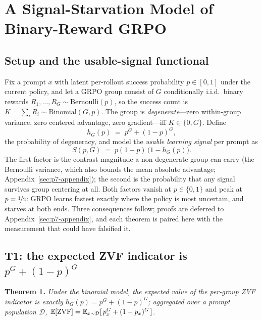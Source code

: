 \section{A Signal-Starvation Model of Binary-Reward GRPO}
\label{sec:p7-theory}

\subsection{Setup and the usable-signal functional}
\label{sec:p7-theory-setup}
Fix a prompt $x$ with latent per-rollout success probability $p \in [0,1]$
under the current policy, and let a GRPO group consist of $G$ conditionally
i.i.d.\ binary rewards $R_1, \dots, R_G \sim \mathrm{Bernoulli}(p)$, so the
success count is $K = \sum_i R_i \sim \mathrm{Binomial}(G, p)$. The group is
\emph{degenerate}---zero within-group variance, zero centered advantage, zero
gradient---iff $K \in \{0, G\}$. Define
\begin{equation}
  h_G(p) \;=\; p^G + (1-p)^G,
  \label{eq:p7-hG}
\end{equation}
the probability of degeneracy, and model the \emph{usable learning signal}
per prompt as
\begin{equation}
  S(p, G) \;=\; p(1-p)\,\bigl(1 - h_G(p)\bigr).
  \label{eq:p7-S}
\end{equation}
The first factor is the contrast magnitude a non-degenerate group can carry
(the Bernoulli variance, which also bounds the mean absolute advantage;
Appendix~\ref{sec:p7-appendix}); the second is the probability that any
signal survives group centering at all. Both factors vanish at $p \in
\{0,1\}$ and peak at $p = \nicefrac{1}{2}$: GRPO learns fastest exactly where
the policy is most uncertain, and starves at both ends. Three consequences
follow; proofs are deferred to Appendix~\ref{sec:p7-appendix}, and each
theorem is paired here with the measurement that could have falsified it.

\subsection{T1: the expected ZVF indicator is $p^G + (1-p)^G$}
\label{sec:p7-t1}
\textbf{Theorem 1.} \emph{Under the binomial model, the expected value of the
per-group ZVF indicator is exactly $h_G(p) = p^G + (1-p)^G$; aggregated over
a prompt population $\mathcal{D}$, $\mathbb{E}[\mathrm{ZVF}] =
\mathbb{E}_{x \sim \mathcal{D}}[\,p_x^G + (1-p_x)^G\,]$.}


